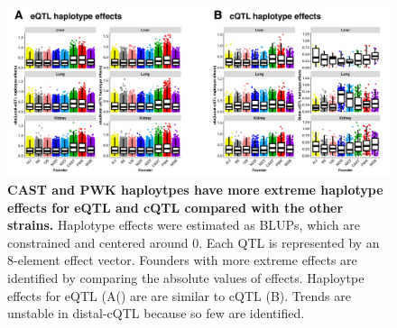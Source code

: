 \documentclass[9pt,twocolumn,twoside]{gsajnl}
\begin{document}
\begin{figure}[hp]
\renewcommand{\familydefault}{\sfdefault}\normalfont
\centering
\includegraphics[width=\textwidth, trim={0in 0in 0in 0in}, clip]{figs/all_qtl_effects_abs.pdf}
\caption{\textbf{CAST and PWK haploytpes have more extreme haplotype effects for eQTL and cQTL compared with the other strains.} Haplotype effects were estimated as BLUPs, which are constrained and centered around 0. Each QTL is represented by an 8-element effect vector. Founders with more extreme effects are identified by comparing the absolute values of effects. Haploytpe effects for eQTL (A() are are similar to cQTL (B). Trends are unstable in distal-cQTL because so few are identified.
\label{fig:qtl_effects_abs}}
\end{figure}
\end{document}
